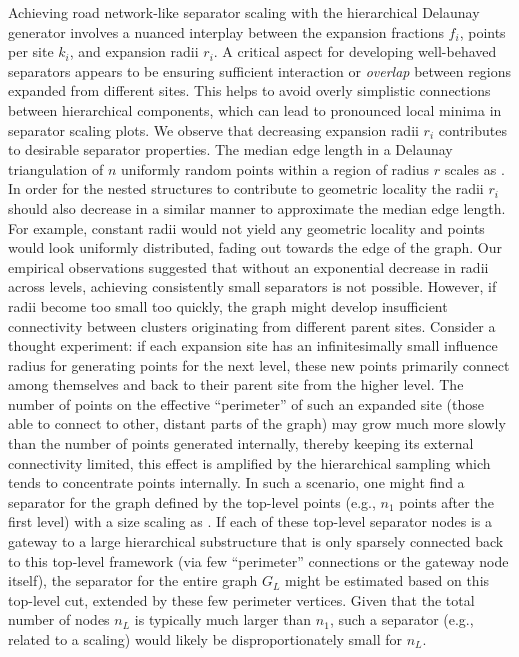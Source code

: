 Achieving road network-like separator scaling with the hierarchical Delaunay generator involves a nuanced interplay between the expansion fractions \(f_i\), points per site \(k_i\), and expansion radii \(r_i\).
A critical aspect for developing well-behaved separators appears to be ensuring sufficient interaction or \emph{overlap} between regions expanded from different sites.
This helps to avoid overly simplistic connections between hierarchical components, which can lead to pronounced local minima in separator scaling plots.
We observe that decreasing expansion radii \(r_i\) contributes to desirable separator properties.
The median edge length in a Delaunay triangulation of \(n\) uniformly random points within a region of radius \(r\) scales as .
In order for the nested structures to contribute to geometric locality the radii \(r_i\) should also decrease in a similar manner to approximate the median edge length.
For example, constant radii would not yield any geometric locality and points would look uniformly distributed, fading out towards the edge of the graph.
Our empirical observations suggested that without an exponential decrease in radii across levels, achieving consistently small separators is not possible.
However, if radii become too small too quickly, the graph might develop insufficient connectivity between clusters originating from different parent sites.
Consider a thought experiment: if each expansion site has an infinitesimally small influence radius for generating points for the next level, these new points primarily connect among themselves and back to their parent site from the higher level.
The number of points on the effective \enquote{perimeter} of such an expanded site (those able to connect to other, distant parts of the graph) may grow much more slowly than the number of points generated internally, thereby keeping its external connectivity limited,
this effect is amplified by the hierarchical sampling which tends to concentrate points internally.
In such a scenario, one might find a separator for the graph defined by the top-level points (e.g., \(n_1\) points after the first level) with a size scaling as .
If each of these top-level separator nodes is a gateway to a large hierarchical substructure that is only sparsely connected back to this top-level framework (via few \enquote{perimeter} connections or the gateway node itself), the separator for the entire graph \(G_L\) might be estimated based on this top-level cut, extended by these few perimeter vertices.
Given that the total number of nodes \(n_L\) is typically much larger than \(n_1\), such a separator (e.g., related to a  scaling) would likely be disproportionately small for \(n_L\).
